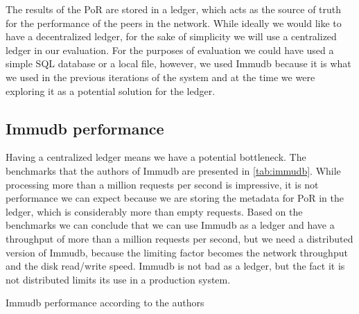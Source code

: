 The results of the PoR are stored in a ledger, which acts as the source of truth for
the performance of the peers in the network.
While ideally we would like to have a decentralized ledger, for the sake of simplicity
we will use a centralized ledger in our evaluation.
For the purposes of evaluation we could have used a simple SQL database or a local file,
however, we used Immudb because it is what we used in the previous iterations of the system
and at the time we were exploring it as a potential solution for the ledger.

\subsection{Immudb performance}

Having a centralized ledger means we have a potential bottleneck.
The benchmarks that the authors of Immudb are presented in \autoref{tab:immudb}.
While processing more than a million requests per second is impressive,
it is not performance we can expect because we are storing the metadata for PoR in the ledger,
which is considerably more than empty requests.
Based on the benchmarks we can conclude that we can use Immudb as a ledger and have
a throughput of more than a million requests per second,
but we need a distributed version of Immudb,
because the limiting factor becomes the network throughput and the disk read/write speed.
Immudb is not bad as a ledger, but the fact it is not distributed limits its use in a production system.

\begin{table}
  \myfloatalign
  \caption{Immudb performance according to the authors \cite{immudb-gh}}
  \label{tab:immudb}
\end{table} 

